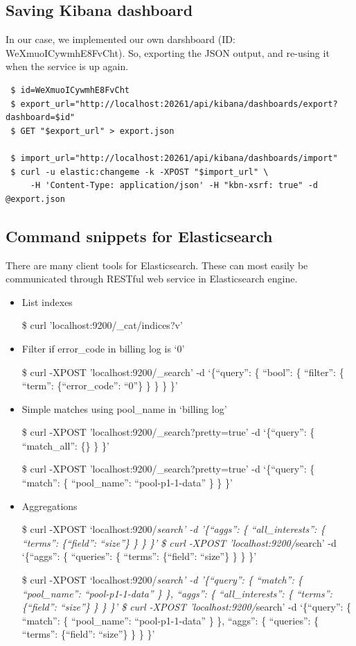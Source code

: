 \documentclass[]{article}
\begin{document}
\subsection{Saving Kibana dashboard}\label{saving-kibana-dashboard}

In our case, we implemented our own darshboard (ID:
WeXmuoICywmhE8FvCht). So, exporting the JSON output, and re-using it
when the service is up again.

\begin{verbatim}
 $ id=WeXmuoICywmhE8FvCht
 $ export_url="http://localhost:20261/api/kibana/dashboards/export?dashboard=$id"
 $ GET "$export_url" > export.json

 $ import_url="http://localhost:20261/api/kibana/dashboards/import"
 $ curl -u elastic:changeme -k -XPOST "$import_url" \
     -H 'Content-Type: application/json' -H "kbn-xsrf: true" -d @export.json
\end{verbatim}

\subsection{Command snippets for
Elasticsearch}\label{command-snippets-for-elasticsearch}

There are many client tools for Elasticsearch. These can most easily be
communicated through RESTful web service in Elasticsearch engine.

\begin{itemize}
\item
  List indexes

  \$ curl 'localhost:9200/\_cat/indices?v'
\item
  Filter if error\_code in billing log is `0'

  \$ curl -XPOST 'localhost:9200/\_search' -d `\{``query'': \{ ``bool'':
  \{ ``filter'': \{ ``term'': \{``error\_code'': ``0''\} \} \} \} \}'
\item
  Simple matches using pool\_name in `billing log'

  \$ curl -XPOST 'localhost:9200/\_search?pretty=true' -d `\{``query'':
  \{ ``match\_all'': \{\} \} \}'

  \$ curl -XPOST 'localhost:9200/\_search?pretty=true' -d `\{``query'':
  \{ ``match'': \{ ``pool\_name'': ``pool-p1-1-data'' \} \} \}'
\item
  Aggregations

  \$ curl -XPOST `localhost:9200/\emph{search' -d '\{``aggs'': \{
  ``all\_interests'': \{ ``terms'': \{``field'': ``size''\} \} \} \}' \$
  curl -XPOST 'localhost:9200/}search' -d `\{``aggs'': \{ ``queries'':
  \{ ``terms'': \{``field'': ``size''\} \} \} \}'

  \$ curl -XPOST `localhost:9200/\emph{search' -d '\{``query'': \{
  ``match'': \{ ``pool\_name'': ``pool-p1-1-data'' \} \}, ``aggs'': \{
  ``all\_interests'': \{ ``terms'': \{``field'': ``size''\} \} \} \}' \$
  curl -XPOST 'localhost:9200/}search' -d `\{``query'': \{ ``match'': \{
  ``pool\_name'': ``pool-p1-1-data'' \} \}, ``aggs'': \{ ``queries'': \{
  ``terms'': \{``field'': ``size''\} \} \} \}'
\end{itemize}
\end{document}
